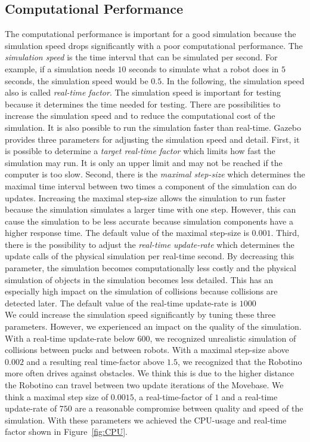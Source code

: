 \subsection{Computational Performance}
The computational performance is important for a good simulation because the simulation speed drops significantly with a poor computational performance. The \textit{simulation speed} is the time interval that can be simulated per second. For example, if a simulation needs $10$ seconds to simulate what a robot does in $5$ seconds, the simulation speed would be $0.5$. In the following, the simulation speed also is called \textit{real-time factor}. The simulation speed is important for testing because it determines the time needed for testing. There are possibilities to increase the simulation speed and to reduce the computational cost of the simulation. It is also possible to run the simulation faster than real-time. Gazebo provides three parameters for adjusting the simulation speed and detail. First, it is possible to determine a \textit{target real-time factor} which limits how fast the simulation may run. It is only an upper limit and may not be reached if the computer is too slow. Second, there is the \textit{maximal step-size} which determines the maximal time interval between two times a component of the simulation can do updates. Increasing the maximal step-size allows the simulation to run faster because the simulation simulates a larger time with one step. However, this can cause the simulation to be less accurate because simulation components have a higher response time. The default value of the maximal step-size is $0.001$. Third, there is the possibility to adjust the \textit{real-time update-rate} which determines the update calls of the  physical simulation per real-time second. By decreasing this parameter, the simulation becomes computationally less costly and the physical simulation of objects in the simulation becomes less detailed. This has an especially high impact on the simulation of collisions because collisions are detected later. The default value of the real-time update-rate is $1000$\\
We could increase the simulation speed significantly by tuning these three parameters. However, we experienced an impact on the quality of the simulation. With a real-time update-rate below $600$, we recognized unrealistic simulation of collisions between pucks and between robots. With a maximal step-size above $0.002$ and a resulting real time-factor above $1.5$, we recognized that the Robotino more often drives against obstacles. We think this is due to the higher distance the Robotino can travel between two update iterations of the Movebase. We think a maximal step size of $0.0015$, a real-time-factor of $1$ and a real-time update-rate of $750$ are a reasonable compromise between quality and speed of the simulation. With these parameters we achieved the CPU-usage and real-time factor shown in Figure~\ref{fig:CPU}.

